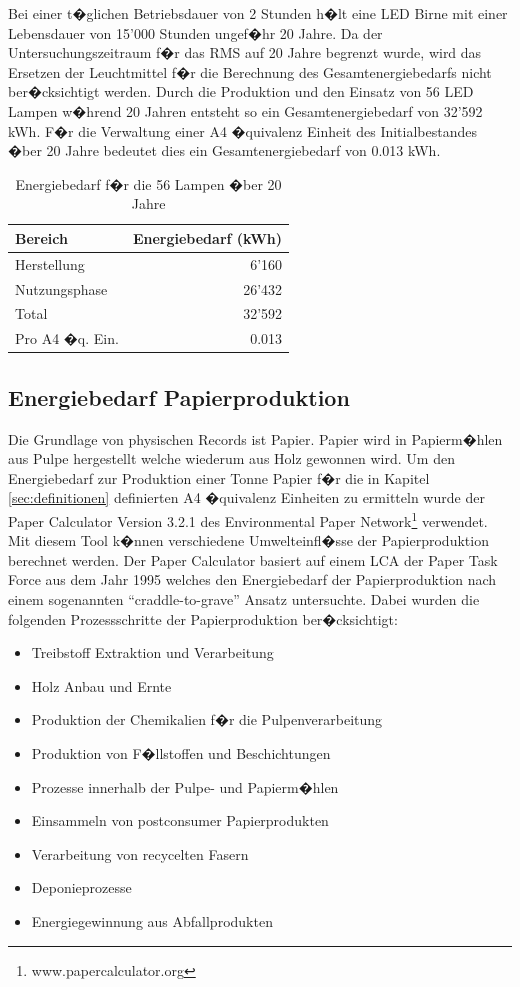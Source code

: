 \documentclass[a4paper,twoside,10pt]{report}
\begin{document}
Bei einer t�glichen Betriebsdauer von 2 Stunden h�lt eine LED Birne mit einer Lebensdauer von 15'000 Stunden ungef�hr 20 Jahre. Da der Untersuchungszeitraum f�r das \acf{RMS} auf 20 Jahre begrenzt wurde, wird das Ersetzen der Leuchtmittel f�r die Berechnung des Gesamtenergiebedarfs nicht ber�cksichtigt werden. Durch die Produktion und den Einsatz von 56 LED Lampen w�hrend 20 Jahren entsteht so ein Gesamtenergiebedarf von 32'592 kWh. F�r die Verwaltung einer A4 �quivalenz Einheit des Initialbestandes �ber 20 Jahre bedeutet dies ein Gesamtenergiebedarf von 0.013 kWh. 

\begin{table} [h]
	\begin{tabular}{l|r}
	\hline
	\textbf{Bereich} & \textbf{Energiebedarf (kWh)} \\
	\hline
	Herstellung &  6'160\\
	Nutzungsphase &	26'432\\
	\hline
	\hline
	Total  & 32'592 \\
	\hline
	Pro A4 �q. Ein. & 0.013 \\
	\hline
	\end{tabular}
\caption{Energiebedarf f�r die 56 Lampen �ber 20 Jahre} 
\label{tab:ges_energ_licht}
\end{table}

\subsection{Energiebedarf Papierproduktion}
Die Grundlage von physischen Records ist Papier. Papier wird in Papierm�hlen aus Pulpe hergestellt welche wiederum aus Holz gewonnen wird. Um den Energiebedarf zur Produktion einer Tonne Papier f�r die in Kapitel \ref{sec:definitionen} definierten A4 �quivalenz Einheiten zu ermitteln wurde der Paper Calculator Version 3.2.1 des Environmental Paper Network\footnote{www.papercalculator.org} verwendet. Mit diesem Tool k�nnen verschiedene Umwelteinfl�sse der Papierproduktion berechnet werden. Der Paper Calculator basiert auf einem \ac{LCA} der Paper Task Force aus dem Jahr 1995 welches den Energiebedarf der Papierproduktion nach einem sogenannten "`craddle-to-grave"' Ansatz untersuchte. Dabei wurden die folgenden Prozessschritte der Papierproduktion ber�cksichtigt:

\begin{itemize}
	\item Treibstoff Extraktion und Verarbeitung
	\item Holz Anbau und Ernte
	\item Produktion der Chemikalien f�r die Pulpenverarbeitung
	\item Produktion von F�llstoffen und Beschichtungen
	\item Prozesse innerhalb der Pulpe- und Papierm�hlen
	\item Einsammeln von postconsumer Papierprodukten
	\item Verarbeitung von recycelten Fasern
	\item Deponieprozesse
	\item Energiegewinnung aus Abfallprodukten
\end{itemize}
\end{document}
